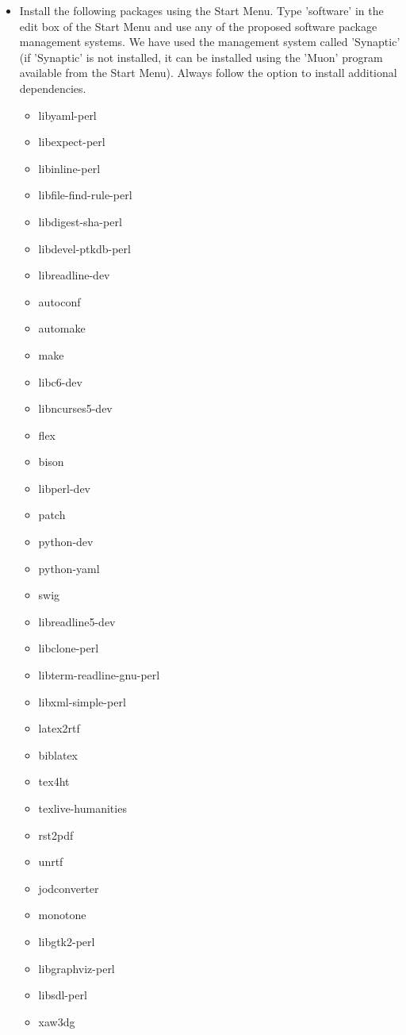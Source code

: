 \documentclass[12pt]{article}
\begin{document}
\begin{itemize}
\item[] Install the following packages using the Start Menu.  Type
  'software' in the edit box of the Start Menu and use any of the
  proposed software package management systems.  We have used the
  management system called 'Synaptic' (if 'Synaptic' is not installed,
  it can be installed using the 'Muon' program available from the
  Start Menu).  Always follow the option to install additional
  dependencies.
      \begin{itemize}
         \item libyaml-perl
         \item libexpect-perl
         \item libinline-perl
         \item libfile-find-rule-perl
         \item libdigest-sha-perl
         \item libdevel-ptkdb-perl
         \item libreadline-dev
         \item autoconf
         \item automake
         \item make
         \item libc6-dev
         \item libncurses5-dev
         \item flex
         \item bison
         \item libperl-dev
         \item patch
         \item python-dev
         \item python-yaml
         \item swig
         \item libreadline5-dev
         \item libclone-perl
         \item libterm-readline-gnu-perl
         \item libxml-simple-perl
         \item latex2rtf
         \item biblatex
         \item tex4ht
         \item texlive-humanities
         \item rst2pdf
         \item unrtf
         \item jodconverter
         \item monotone
         \item libgtk2-perl
         \item libgraphviz-perl
         \item libsdl-perl
         \item xaw3dg
      \end{itemize}
 \end{itemize}
\end{document}
